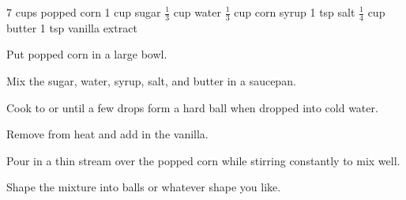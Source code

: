 \dishtype{\dessert}
\dishother{\vegetarian}
\begin{ingreds}
    7 cups popped corn
    1 cup sugar
    $\frac{1}{3}$ cup water
    $\frac{1}{3}$ cup corn syrup
    1 tsp salt
    $\frac{1}{4}$ cup butter
    1 tsp vanilla extract
\end{ingreds}
\begin{method}
    Put popped corn in a large bowl.\par
    Mix the sugar, water, syrup, salt, and butter in a saucepan.\par
    Cook to  or until a few drops form a hard ball when dropped into cold water.\par
    Remove from heat and add in the vanilla.\par
    Pour in a thin stream over the popped corn while stirring constantly to mix well.\par
    Shape the mixture into balls or whatever shape you like.
\end{method}